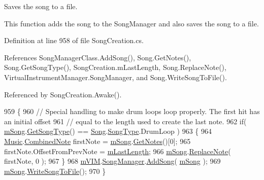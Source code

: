 Saves the song to a file. 

This function adds the song to the Song\+Manager and also saves the song to a file. 

Definition at line 958 of file Song\+Creation.\+cs.



References Song\+Manager\+Class.\+Add\+Song(), Song.\+Get\+Notes(), Song.\+Get\+Song\+Type(), Song\+Creation.\+m\+Last\+Length, Song.\+Replace\+Note(), Virtual\+Instrument\+Manager.\+Song\+Manager, and Song.\+Write\+Song\+To\+File().



Referenced by Song\+Creation.\+Awake().


\begin{DoxyCode}
959     \{
960         \textcolor{comment}{// Special handling to make drum loops loop properly. The first hit has an initial offset}
961         \textcolor{comment}{// equal to the length used to create the last note.}
962         \textcolor{keywordflow}{if}( \hyperlink{group___s_c_priv_var_ga9554e9b3758d1cc1e841a5f7d8aa9f56}{mSong}.\hyperlink{group___song_const_gabae5b5d8f727b2d9da7867a99347f86b}{GetSongType}() == \hyperlink{class_song}{Song}.\hyperlink{group___song_const_gae681a1f001333e39fc1cb4fea97bfe1b}{SongType}.DrumLoop )
963         \{
964             \hyperlink{class_music}{Music}.\hyperlink{group___music_structs_struct_music_1_1_combined_note}{CombinedNote} firstNote = \hyperlink{group___s_c_priv_var_ga9554e9b3758d1cc1e841a5f7d8aa9f56}{mSong}.\hyperlink{group___song_const_gae68b5599292e27409d6599d00b5bbfa2}{GetNotes}()[0];
965             firstNote.OffsetFromPrevNote = \hyperlink{group___s_c_priv_var_ga220707a4bf66dc6fee4e7bc9b7f2ed60}{mLastLength};
966             \hyperlink{group___s_c_priv_var_ga9554e9b3758d1cc1e841a5f7d8aa9f56}{mSong}.\hyperlink{group___song_const_ga326d61c75339080057a02c6decb0cde3}{ReplaceNote}( firstNote, 0 );
967         \}
968         \hyperlink{group___s_c_priv_var_ga1bad472098eec4194c5b18e7b3ccfd94}{mVIM}.\hyperlink{group___v_i_m_pub_ga33dae94932c10c66db76a0eebec76b01}{SongManager}.\hyperlink{class_song_manager_class_a1a228cb2a64e55448ccf9d1d618f05b7}{AddSong}( \hyperlink{group___s_c_priv_var_ga9554e9b3758d1cc1e841a5f7d8aa9f56}{mSong} );
969         \hyperlink{group___s_c_priv_var_ga9554e9b3758d1cc1e841a5f7d8aa9f56}{mSong}.\hyperlink{group___song_const_ga70b0f6021c3b0590c561a88e3d1e5c2f}{WriteSongToFile}();
970     \}
\end{DoxyCode}
\mbox{\label{group___s_c_handlers_ga33e6eb8e123cb32f40c2c06149a31087}} 
